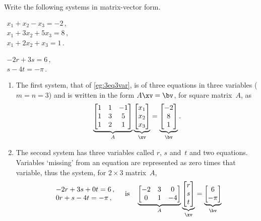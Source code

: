 \begin{example} \label{eg:matvecsys}
Write the following systems in matrix-vector form.
\begin{Parts}
\item \(\begin{array}{l}
x_1+x_2-x_3=-2\,,\\
x_1+3x_2+5x_3=8\,,\\
x_1+2x_2+x_3=1\,.
\end{array}\)

\item \(\begin{array}{l} -2r+3s=6\,,\\s-4t=-\pi\,. \end{array}\)
\end{Parts}
\begin{solution} 
\begin{enumerate}
\item The first system, that of \cref{eg:3eq3var}, is of three equations in three variables (\(m=n=3\)) and is written in the form \(A\xv=\bv\), for square matrix~\(A\), as
\begin{equation*}
\underbrace{\begin{bmatrix} 1&1&-1\\ 1&3&5\\1&2&1 \end{bmatrix}}_A
\underbrace{\begin{bmatrix} x_1\\x_2\\x_3 \end{bmatrix}}_\xv
=\underbrace{\begin{bmatrix} -2\\8\\1 \end{bmatrix}}_\bv .
\end{equation*}

\item The second system has three variables called \(r\), \(s\) and~\(t\) and two equations.
Variables `missing' from an equation are represented as zero times that variable, thus the system, for \(2\times3\) matrix~\(A\),
\begin{equation*}
\begin{array}{l} -2r+3s+0t=6\,,\\0r+s-4t=-\pi\,, \end{array}
\quad\text{is}\quad
\underbrace{\begin{bmatrix} -2&3&0\\ 0&1&-4 \end{bmatrix}}_A
\underbrace{\begin{bmatrix} r\\s\\t \end{bmatrix}}_\xv
=\underbrace{\begin{bmatrix} 6\\-\pi \end{bmatrix}}_\bv 
\end{equation*}
\end{enumerate}
\end{solution}
\end{example}



